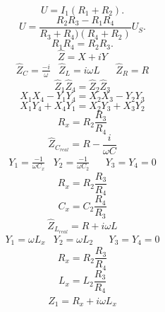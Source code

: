 \begin{equation}
  U=I_1 (R_1 + R_2)   .
\end{equation}
\begin{equation}
  U=\frac{R_2 R_3 - R_1 R_4}{R_3 + R_4)(R_4 + R_2) }U_S   .
\end{equation}
\begin{equation}
  R_1 R_4 =R_2 R_3   .
\end{equation}
\begin{equation}
\hat{Z}=X + iY
\end{equation}
\begin{align}
&\hat{Z}_C = \frac{-i}{\omega}  &  \hat{Z}_L=i\omega L & & \hat{Z}_R = R &
\end{align}
\begin{equation}
\hat{Z}_1\hat{Z}_4=\hat{Z}_2\hat{Z}_3
\end{equation}
\begin{equation}
X_1X_4-Y_1Y_4=X_2X_3-Y_2Y_3
\end{equation}
\begin{equation}
X_1Y_4+X_4Y_1=X_2Y_3+X_3Y_2
\end{equation}
\begin{equation}
R_x=R_2 \frac{R_3}{R_4}
\end{equation}
\begin{equation}
\hat{Z}_{C_{real}}=R-\frac{i}{\omega C}
\end{equation}
\begin{align}
&Y_1=\frac{-1}{\omega C_x} & Y_2=\frac{-1}{\omega C_2} & & Y_3=Y_4=0 &
\end{align}
\begin{equation}
R_x=R_2\frac{R_3}{R_4}
\end{equation}
\begin{equation}
C_x=C_2\frac{R_4}{R_3}
\end{equation}
\begin{equation}
\hat{Z}_{L_{real}}=R+i\omega L
\end{equation}
\begin{align}
&Y_1=\omega L_x  & Y_2=\omega L_2 & & Y_3=Y_4=0 &
\end{align}
\begin{equation}
R_x=R_2\frac{R_3}{R_4}
\end{equation}
\begin{equation}
L_x=L_2 \frac{R_3}{R_4}
\end{equation}
\begin{equation}
\hat{Z}_1=R_x+i \omega L_x
\end{equation}
